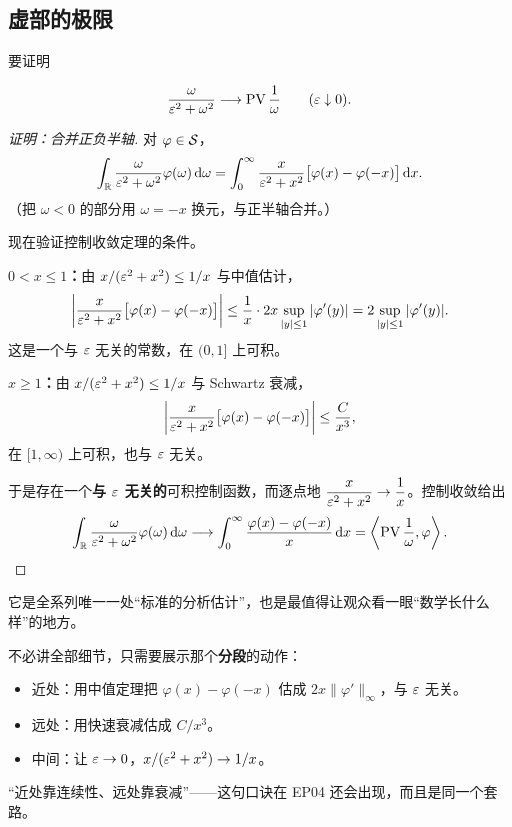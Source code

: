 \subsection{虚部的极限}

要证明

\begin{equation}
\frac{\omega}{\varepsilon^{2}+\omega^{2}}\longrightarrow\operatorname{PV}\frac{1}{\omega}
\qquad(\varepsilon\downarrow0).
\end{equation}

\begin{proof}[证明：合并正负半轴]
对 $\varphi\in\mathcal{S}$，
\begin{equation}
\int_{\mathbb{R}}\frac{\omega}{\varepsilon^{2}+\omega^{2}}\varphi(\omega)\mathop{}\!\mathrm{d}\omega
=\int_{0}^{\infty}\frac{x}{\varepsilon^{2}+x^{2}}\big[\varphi(x)-\varphi(-x)\big]\mathop{}\!\mathrm{d} x .
\end{equation}
（把 $\omega<0$ 的部分用 $\omega=-x$ 换元，与正半轴合并。）

现在验证控制收敛定理的条件。

\textbf{$0<x\le1$：}由 $x/(\varepsilon^{2}+x^{2})\le 1/x$ 与中值估计，
\begin{equation}
\left|\frac{x}{\varepsilon^{2}+x^{2}}\big[\varphi(x)-\varphi(-x)\big]\right|
\le\frac{1}{x}\cdot2x\sup_{|y|\le1}|\varphi'(y)|
=2\sup_{|y|\le1}|\varphi'(y)| .
\end{equation}
这是一个与 $\varepsilon$ 无关的常数，在 $(0,1]$ 上可积。

\textbf{$x\ge1$：}由 $x/(\varepsilon^{2}+x^{2})\le1/x$ 与 Schwartz 衰减，
\begin{equation}
\left|\frac{x}{\varepsilon^{2}+x^{2}}\big[\varphi(x)-\varphi(-x)\big]\right|\le\frac{C}{x^{3}},
\end{equation}
在 $[1,\infty)$ 上可积，也与 $\varepsilon$ 无关。

于是存在一个\textbf{与 $\varepsilon$ 无关的}可积控制函数，而逐点地 $\dfrac{x}{\varepsilon^{2}+x^{2}}\to\dfrac{1}{x}$。控制收敛给出
\begin{equation}
\int_{\mathbb{R}}\frac{\omega}{\varepsilon^{2}+\omega^{2}}\varphi(\omega)\mathop{}\!\mathrm{d}\omega
\longrightarrow\int_{0}^{\infty}\frac{\varphi(x)-\varphi(-x)}{x}\mathop{}\!\mathrm{d} x
=\left\langle\operatorname{PV}\frac{1}{\omega},\varphi\right\rangle .
\end{equation}
\end{proof}

\begin{ideabox}[这个证明值得在视频里“演”一遍]
它是全系列唯一一处“标准的分析估计”，也是最值得让观众看一眼“数学长什么样”的地方。

不必讲全部细节，只需要展示那个\textbf{分段}的动作：
\begin{itemize}[leftmargin=1.4em,itemsep=0.2em]
\item 近处：用中值定理把 $\varphi(x)-\varphi(-x)$ 估成 $2x\|\varphi'\|_\infty$，与 $\varepsilon$ 无关。
\item 远处：用快速衰减估成 $C/x^{3}$。
\item 中间：让 $\varepsilon\to0$，$x/(\varepsilon^{2}+x^{2})\to1/x$。
\end{itemize}
“近处靠连续性、远处靠衰减”——这句口诀在 EP04 还会出现，而且是同一个套路。
\end{ideabox}


